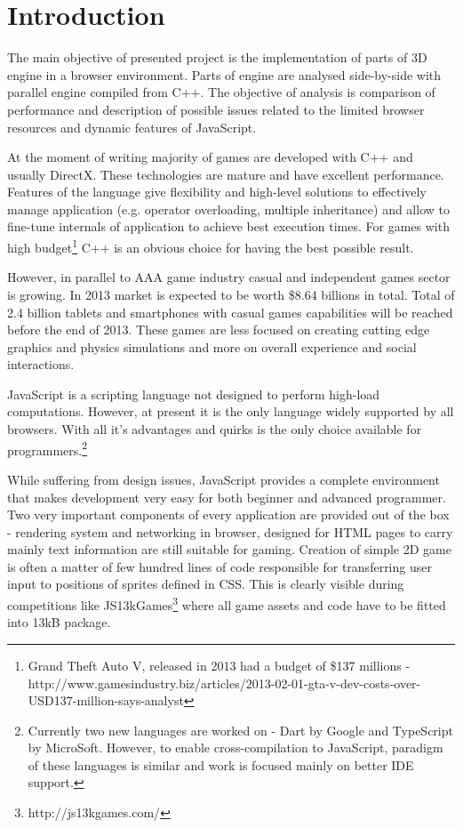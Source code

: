 \chapter{Introduction}
\label{cha:introduction}

The main objective of presented project is the implementation of parts of 3D engine in a browser environment. Parts of engine are analysed side-by-side with parallel engine compiled from C++. The objective of analysis is comparison of performance and description of possible issues related to the limited browser resources and dynamic features of JavaScript.

At the moment of writing majority of games are developed with C++ and usually DirectX. These technologies are mature and have excellent performance. Features of the language give flexibility and high-level solutions to effectively manage application (e.g. operator overloading, multiple inheritance) and allow to fine-tune internals of application to achieve best execution times. For games with high budget\footnote{Grand Theft Auto V, released in 2013 had a budget of \$137 millions - http://www.gamesindustry.biz/articles/2013-02-01-gta-v-dev-costs-over-USD137-million-says-analyst} C++ is an obvious choice for having the best possible result.

However, in parallel to AAA game industry casual and independent games sector is growing. In 2013 market is expected to be worth \$8.64 billions in total. Total of 2.4 billion tablets and smartphones with casual games capabilities will be reached before the end of 2013. These games are less focused on creating cutting edge graphics and physics simulations and more on overall experience and social interactions.

JavaScript is a scripting language not designed to perform high-load computations. However, at present it is the only language widely supported by all browsers. With all it's advantages and quirks is the only choice available for programmers.\footnote{Currently two new languages are worked on - Dart by Google and TypeScript by MicroSoft. However, to enable cross-compilation to JavaScript, paradigm of these languages is similar and work is focused mainly on better IDE support.}

While suffering from design issues, JavaScript provides a complete environment that makes development very easy for both beginner and advanced programmer. Two very important components of every application are provided out of the box - rendering system and networking in browser, designed for HTML pages to carry mainly text information are still suitable for gaming. Creation of simple 2D game is often a matter of few hundred lines of code responsible for transferring user input to positions of sprites defined in CSS. This is clearly visible during competitions like JS13kGames\footnote{http://js13kgames.com/} where all game assets and code have to be fitted into 13kB package. 

